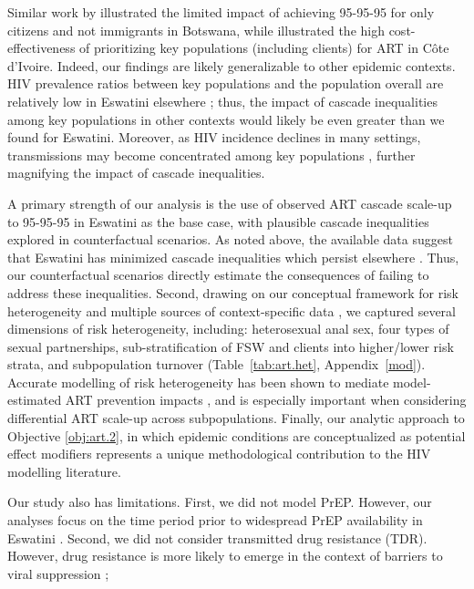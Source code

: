 Similar work by \citet{Marukutira2020} illustrated the limited impact of
achieving 95-95-95 for only citizens and not immigrants in Botswana,
while \citet{Maheu-Giroux2019cost} illustrated the high cost-effectiveness of
prioritizing key populations (including clients) for ART in C\^{o}te d’Ivoire.
Indeed, our findings are likely generalizable to other epidemic contexts.
HIV prevalence ratios between key populations and the population overall
are relatively low in Eswatini \vs elsewhere \cite{Baral2012,Hessou2019};
thus, the impact of cascade inequalities among key populations in other contexts
would likely be even greater than we found for Eswatini.
Moreover, as HIV incidence declines in many settings,
transmissions may become concentrated among key populations \cite{Brown2019,Garnett2021},
further magnifying the impact of cascade inequalities.
\par
A primary strength of our analysis is the use of
observed ART cascade scale-up to 95-95-95 in Eswatini as the base case,
with plausible cascade inequalities explored in counterfactual scenarios.
As noted above, the available data suggest that Eswatini has
minimized cascade inequalities which persist elsewhere \cite{Hakim2018}.
Thus, our counterfactual scenarios directly estimate
the consequences of failing to address these inequalities.
Second, drawing on our conceptual framework for risk heterogeneity \cite[Table~1]{Knight2022sr}
and multiple sources of context-specific data
\cite{SDHS2006,SHIMS1,SHIMS2,Baral2014,EswKP2014,EswIBBS2022},
we captured several dimensions of risk heterogeneity, including:
heterosexual anal sex,
four types of sexual partnerships,
sub-stratification of FSW and clients into higher/lower risk strata,
and subpopulation turnover
(Table~\ref{tab:art.het}, Appendix~\ref{mod}).
Accurate modelling of risk heterogeneity
has been shown to mediate model-estimated ART prevention impacts \cite{Hontelez2013},
and is especially important when considering differential ART scale-up across subpopulations.
Finally, our analytic approach to Objective \ref{obj:art.2},
in which epidemic conditions are conceptualized as potential effect modifiers
represents a unique methodological contribution to the HIV modelling literature.
\par
Our study also has limitations.
First, we did not model PrEP.
However, our analyses focus on the time period
prior to widespread PrEP availability in Eswatini \cite{EswIBBS2022}.
Second, we did not consider transmitted drug resistance (TDR).
However, drug resistance is more likely to emerge
in the context of barriers to viral suppression \cite{Pham2014};
